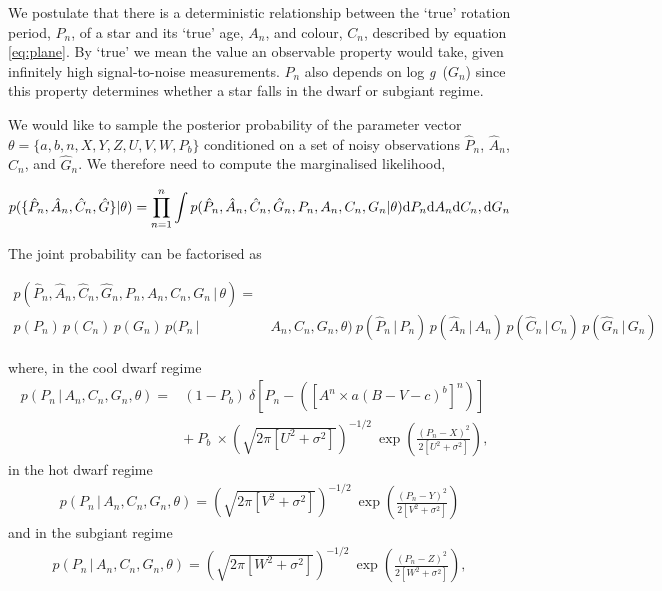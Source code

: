 \documentclass[10pt,preprint]{aastex}
\newcommand{\logg}{log \emph{g}~}
\newcommand{\ah}{$\hat{A}_n$}
\newcommand{\ph}{$\hat{P}_n$}
\newcommand{\ch}{$\hat{C}_n$}
\newcommand{\gh}{$\hat{G}_n$}
\begin{document}
We postulate that there is a deterministic relationship between the `true' rotation period, $P_n$, of a star and its `true' age, $A_n$, and colour, $C_n$, described by equation \ref{eq:plane}.
By `true' we mean the value an observable property would take, given infinitely high signal-to-noise measurements.
$P_n$ also depends on \logg($G_n$) since this property determines whether a star falls in the dwarf or subgiant regime.

We would like to sample the posterior probability of the parameter vector $\theta = \{a, b, n, X, Y, Z, U, V, W, P_b\}$ conditioned on a set of noisy observations \ph, \ah, \ch, and \gh.
We therefore need to compute the marginalised likelihood,

\begin{equation}
	p(\{\hat{P}_n,\hat{A}_n,\hat{C}_n,\hat{G}\}|\theta) =
	\prod_{n=1}^{n} \int p(\hat{P}_n,\hat{A}_n,\hat{C}_n,\hat{G}_n,P_n,A_n,C_n,G_n|\theta)
	{\rm d}P_n {\rm d}A_n {\rm d}C_n,{\rm d}G_n
\label{eq:fulll}
\end{equation}

The joint probability can be factorised as

\begin{align}
	p(\hat{P}_n,\hat{A}_n,\hat{C}_n,\hat{G}_n,P_n,A_n,C_n,G_n\,|\,\theta) = & \nonumber \\
	p(P_n)\,p(C_n)\,p(G_n)\,p(P_n\,| & \,A_n,C_n,G_n,\theta)\
        p(\hat{P}_n\,|\,P_n)\,p(\hat{A}_n\,|\,A_n)\,p(\hat{C}_n\,|\,C_n)\,p(\hat{G}_n\,|\,G_n)
\nonumber
\end{align}

where, in the cool dwarf regime
\begin{eqnarray}
p(P_n\,|\,A_n,C_n,G_n,\theta) =
	& (1-P_b)~\delta \left [P_n - \left(\left[A^n \times a(B-V - c)^b\right]^n\right) \right] \quad \\
	& +~P_b~\times \left(\sqrt{2\pi[U^2+\sigma^2]}\right)^{-1/2}~\exp\left({\frac{(P_n-X)^2}{2[U^2+\sigma^2]}}\right),
\end{eqnarray}
in the hot dwarf regime
\begin{eqnarray}
p(P_n\,|\,A_n,C_n,G_n,\theta) = \left(\sqrt{2\pi[V^2+\sigma^2]}\right)^{-1/2}~\exp\left({\frac{(P_n-Y)^2}{2[V^2+\sigma^2]}}\right)
\end{eqnarray}
and in the subgiant regime
\begin{eqnarray}
p(P_n\,|\,A_n,C_n,G_n,\theta) = \left(\sqrt{2\pi[W^2+\sigma^2]}\right)^{-1/2}~\exp\left({\frac{(P_n-Z)^2}{2[W^2+\sigma^2]}}\right),
\end{eqnarray}
\end{document}
